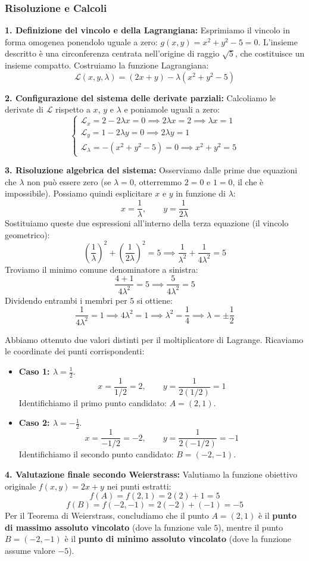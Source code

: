 \subsubsection{Risoluzione e Calcoli}
\textbf{1. Definizione del vincolo e della Lagrangiana:} Esprimiamo il vincolo in forma omogenea ponendolo uguale a zero: $g(x,y) = x^2 + y^2 - 5 = 0$. L'insieme descritto è una circonferenza centrata nell'origine di raggio $\sqrt{5}$, che costituisce un insieme compatto. Costruiamo la funzione Lagrangiana:
\[ \mathcal{L}(x,y,\lambda) = (2x + y) - \lambda(x^2 + y^2 - 5) \]

\textbf{2. Configurazione del sistema delle derivate parziali:} Calcoliamo le derivate di $\mathcal{L}$ rispetto a $x$, $y$ e $\lambda$ e poniamole uguali a zero:
\[
\begin{cases}
\mathcal{L}_x = 2 - 2\lambda x = 0 \implies 2\lambda x = 2 \implies \lambda x = 1 \\[1ex]
\mathcal{L}_y = 1 - 2\lambda y = 0 \implies 2\lambda y = 1 \\[1ex]
\mathcal{L}_\lambda = -(x^2 + y^2 - 5) = 0 \implies x^2 + y^2 = 5
\end{cases}
\]

\textbf{3. Risoluzione algebrica del sistema:} Osserviamo dalle prime due equazioni che $\lambda$ non può essere zero (se $\lambda = 0$, otterremmo $2=0$ e $1=0$, il che è impossibile). Possiamo quindi esplicitare $x$ e $y$ in funzione di $\lambda$:
\[ x = \frac{1}{\lambda}, \qquad y = \frac{1}{2\lambda} \]
Sostituiamo queste due espressioni all'interno della terza equazione (il vincolo geometrico):
\[ \left(\frac{1}{\lambda}\right)^2 + \left(\frac{1}{2\lambda}\right)^2 = 5 \implies \frac{1}{\lambda^2} + \frac{1}{4\lambda^2} = 5 \]
Troviamo il minimo comune denominatore a sinistra:
\[ \frac{4 + 1}{4\lambda^2} = 5 \implies \frac{5}{4\lambda^2} = 5 \]
Dividendo entrambi i membri per $5$ si ottiene:
\[ \frac{1}{4\lambda^2} = 1 \implies 4\lambda^2 = 1 \implies \lambda^2 = \frac{1}{4} \implies \lambda = \pm \frac{1}{2} \]

Abbiamo ottenuto due valori distinti per il moltiplicatore di Lagrange. Ricaviamo le coordinate dei punti corrispondenti:
\begin{itemize}
    \item \textbf{Caso 1: $\lambda = \frac{1}{2}$}.
    \[ x = \frac{1}{1/2} = 2, \qquad y = \frac{1}{2(1/2)} = 1 \]
    Identifichiamo il primo punto candidato: $A = (2,1)$.
    
    \item \textbf{Caso 2: $\lambda = -\frac{1}{2}$}.
    \[ x = \frac{1}{-1/2} = -2, \qquad y = \frac{1}{2(-1/2)} = -1 \]
    Identifichiamo il secondo punto candidato: $B = (-2,-1)$.
\end{itemize}

\textbf{4. Valutazione finale secondo Weierstrass:} Valutiamo la funzione obiettivo originale $f(x,y) = 2x + y$ nei punti estratti:
\[ f(A) = f(2,1) = 2(2) + 1 = 5 \]
\[ f(B) = f(-2,-1) = 2(-2) + (-1) = -5 \]
Per il Teorema di Weierstrass, concludiamo che il punto $A = (2,1)$ è il \textbf{punto di massimo assoluto vincolato} (dove la funzione vale $5$), mentre il punto $B = (-2,-1)$ è il \textbf{punto di minimo assoluto vincolato} (dove la funzione assume valore $-5$).